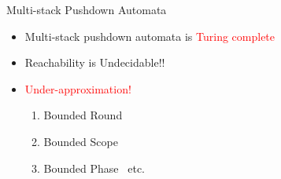 \documentclass{beamer}
\begin{document}
\begin{frame}{ Multi-stack Pushdown Automata}
  \begin{itemize}
  \item Multi-stack pushdown automata is \textcolor{red}{Turing
      complete}
  \item Reachability is Undecidable!!
  \item \textcolor{red}{Under-approximation!} 
    \begin{enumerate}
    \item Bounded Round~
    \item Bounded Scope~
    \item Bounded Phase~ etc.
    \end{enumerate}
  \end{itemize}
\end{frame}
\end{document}

